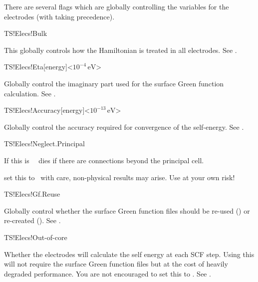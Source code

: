There are several flags which are globally controlling the variables
for the electrodes (with  taking precedence).

\begin{fdflogicalT}{TS!Elecs!Bulk}

  This globally controls how the Hamiltonian is treated in all
  electrodes. 
  See .
  
\end{fdflogicalT}

\begin{fdfentry}{TS!Elecs!Eta}[energy]<$10^{-4}\,\mathrm{eV}$>
  
  Globally control the imaginary part used for the surface Green
  function calculation.
  See .
  
\end{fdfentry}

\begin{fdfentry}{TS!Elecs!Accuracy}[energy]<$10^{-13}\,\mathrm{eV}$>
  
  Globally control the accuracy required for convergence of the self-energy.
  See .
  
\end{fdfentry}

\begin{fdflogicalF}{TS!Elecs!Neglect.Principal}
  
  If this is \fdffalse\ \tsiesta\ dies if there are connections beyond
  the principal cell.

  \note set this to \fdftrue\ with care, non-physical results may
  arise. Use at your own risk!

\end{fdflogicalF}  

\begin{fdflogicalT}{TS!Elecs!Gf.Reuse}
  
  Globally control whether the surface Green function files should
  be re-used (\fdftrue) or re-created (\fdffalse).
  See .
  
\end{fdflogicalT}

\begin{fdflogicalT}{TS!Elecs!Out-of-core}

  Whether the electrodes will calculate the self energy at each SCF
  step. Using this will not require the surface Green function files
  but at the cost of heavily degraded performance.
  You are not encouraged to set this to \fdffalse.
  See .
  
\end{fdflogicalT}

